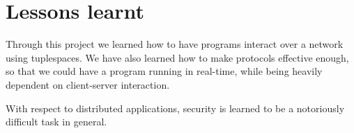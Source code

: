 \section{Lessons learnt}

Through this project we learned how to have programs interact over a network using tuplespaces. We have also learned how to make protocols effective enough, so that we could have a program running in real-time, while being heavily dependent on client-server interaction. 

With respect to distributed applications, security is learned to be a notoriously difficult task in general.